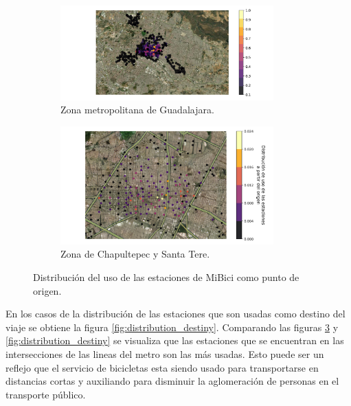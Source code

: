 \begin{figure}[H]
    \centering
    \begin{subfigure}[b]{8.2cm}
        \includegraphics[width=8.2cm]{Graphics/repetition_origen.png}
        \caption{Zona metropolitana de Guadalajara.}
        \label{fig:distribution_station_all_origin}
    \end{subfigure}
    \begin{subfigure}[b]{8.2cm}
        \includegraphics[width=8.2cm]{Graphics/repetition_origen_zoom.png}
        \caption{Zona de Chapultepec y Santa Tere.}
        \label{fig:distribution_station_zoom_origin}
    \end{subfigure}
    \caption{Distribución del uso de las estaciones de MiBici como punto de origen.}
    \label{fig:distribution_origin}
\end{figure}

En los casos de la distribución de las estaciones que son usadas como destino del viaje se obtiene la figura \ref{fig:distribution_destiny}. Comparando las figuras \ref{fig:distribution_origin} y \ref{fig:distribution_destiny} se visualiza que las estaciones que se encuentran en las intersecciones de las lineas del metro son las más usadas. Esto puede ser un reflejo que el servicio de bicicletas esta siendo usado para transportarse en distancias cortas y auxiliando para disminuir la aglomeración de personas en el transporte público.

